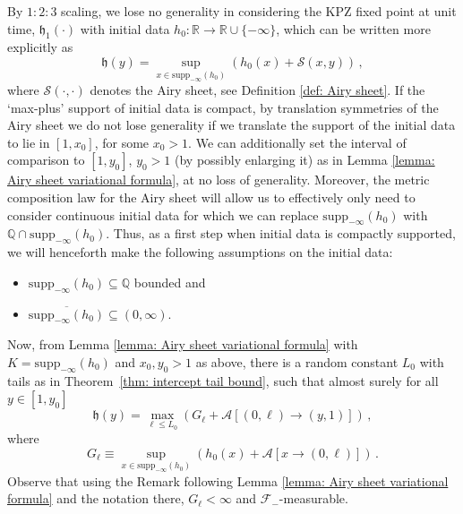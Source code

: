 \documentclass[11pt, reqno]{amsart}
\numberwithin{equation}{section}
\newcommand{\R}{\ensuremath{\mathbb{R}}}
\newcommand{\Q}{\ensuremath{\mathbb{Q}}}
\newcommand{\supp}[1]{\mathrm{supp}_{-\infty}(#1)}
\begin{document}
By $1:2:3$ scaling, we lose no generality in considering the KPZ fixed point at unit time, $\mathfrak{h}_1(\cdot)$ with initial data $h_0:\R\to \R\cup \{-\infty\}$, which can be written more explicitly as
    \begin{equation*}
    \mathfrak{h}(y) = \sup_{x\in \mathrm{supp}_{-\infty}(h_0)}(h_0(x)+\mathcal{S}(x,y))\,,
    \end{equation*}
    where $\mathcal{S}(\cdot, \cdot)$ denotes the Airy sheet, see Definition \ref{def: Airy sheet}. If the `max-plus' support of initial data is compact, by translation symmetries of the Airy sheet \cite[Lemma 9.1]{DOV} we do not lose generality if we translate the support of the initial data to lie in $[1,x_0]$, for some $x_0>1$. We can additionally set the interval of comparison to $[1,y_0]$, $y_0>1$ (by possibly enlarging it) as in Lemma \ref{lemma: Airy sheet variational formula}, at no loss of generality. Moreover, the metric composition law for the Airy sheet \cite[Proposition 9.2]{DOV} will allow us to effectively only need to consider continuous initial data for which we can replace $\supp{h_0}$ with $\Q\cap \supp{h_0}$. Thus, as a first step when initial data is compactly supported, we will henceforth make the following assumptions on the initial data:
    \begin{itemize}\label{assumption initial data}
        \item[1.] $\mathrm{supp}_{-\infty}(h_0)\subseteq \Q$ bounded and
        \item[2.] $\overline{\mathrm{supp}_{-\infty}(h_0)}\subseteq(0,\infty)$. 
    \end{itemize}
    
    Now, from Lemma \ref{lemma: Airy sheet variational formula} with $K = \mathrm{supp}_{-\infty}(h_0)$ and $x_0, y_0>1$ as above, there is a random constant $L_0$ with tails as in Theorem~\ref{thm: intercept tail bound}, such that almost surely for all $y\in[1,y_0]$
    \begin{equation*}
    \mathfrak{h}(y) = \max_{\ell\leq L_0}(G_{\ell}+\mathcal{A}[(0,\ell)\to (y,1)])\,,
    \end{equation*}
    where
    \begin{equation}\label{eq: bdry data}
    G_\ell \equiv \sup_{ x\in \mathrm{supp}_{-\infty}(h_0)}(h_0(x)+\mathcal{A}[x\to(0,\ell)])\,.
    \end{equation}
    Observe that using the Remark following Lemma \ref{lemma: Airy sheet variational formula} and the notation there, $G_\ell< \infty$ and $\mathscr{F}_-$-measurable.
\end{document}
